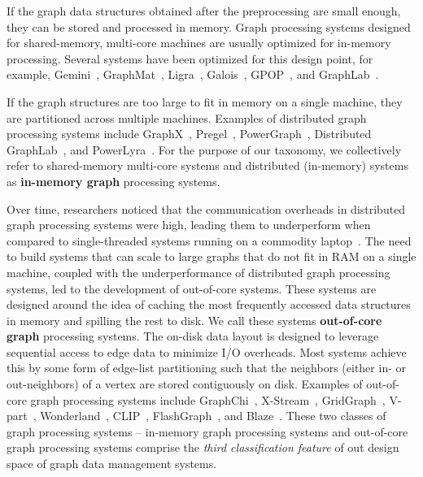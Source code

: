 If the graph data structures obtained after the preprocessing are small enough, they can be stored and processed in memory.
Graph processing systems designed for shared-memory, multi-core machines are usually optimized for in-memory processing.
Several systems have been optimized for this design point, for example, Gemini~\cite{zhu2016gemini}, GraphMat~\cite{graphmat}, Ligra~\cite{shun2013ligra}, Galois~\cite{pingali2011tao}, GPOP~\cite{lakhotia2020gpop}, and GraphLab~\cite{low2012distributed}.

If the graph structures are too large to fit in memory on a single machine, they are partitioned across multiple machines.
Examples of distributed graph processing systems include GraphX~\cite{gonzalez2014graphx}, Pregel~\cite{malewicz2010pregel}, PowerGraph~\cite{gonzalez2012powergraph}, Distributed GraphLab~\cite{low2012distributed}, and PowerLyra~\cite{powerlyra2019}.
For the purpose of our taxonomy, we collectively refer to shared-memory multi-core systems and distributed (in-memory) systems as \textbf{in-memory graph} processing systems.

Over time, researchers noticed that the communication overheads in distributed graph processing systems were high, leading them to underperform when compared to single-threaded systems running on a commodity laptop~\cite{mcsherry2015scalability}.
The need to build systems that can scale to large graphs that do not fit in RAM on a single machine, coupled with the underperformance of distributed graph processing systems, led to the development of out-of-core systems.
These systems are designed around the idea of caching the most frequently accessed data structures in memory and spilling the rest to disk.
We call these systems \textbf{out-of-core graph} processing systems.
The on-disk data layout is designed to leverage sequential access to edge data to minimize I/O overheads.
Most systems achieve this by some form of edge-list partitioning such that the neighbors (either in- or out-neighbors) of a vertex are stored contiguously on disk.
Examples of out-of-core graph processing systems include GraphChi~\cite{kyrola2012graphchi}, X-Stream~\cite{roy2013x}, GridGraph~\cite{zhu2015gridgraph}, V-part~\cite{elyasi2019large}, Wonderland~\cite{zhang2018wonderland}, CLIP~\cite{ai2018clip}, FlashGraph~\cite{zheng2015flashgraph}, and Blaze~\cite{kim2022blaze}.
These two classes of graph processing systems -- in-memory graph processing systems and out-of-core graph processing systems comprise the
\textit{third classification feature} of out design space of graph data management systems.

